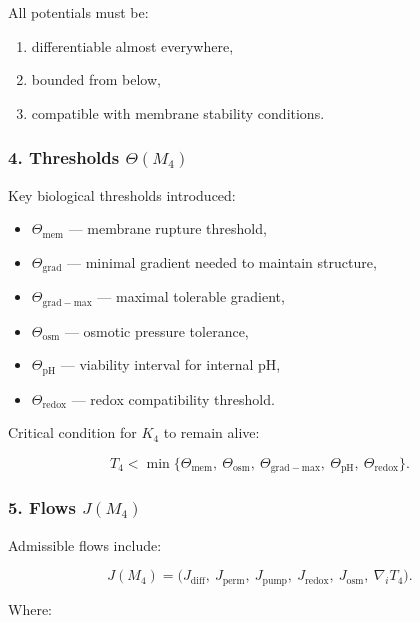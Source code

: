 All potentials must be:

\begin{enumerate}
    \item differentiable almost everywhere,
    \item bounded from below,
    \item compatible with membrane stability conditions.
\end{enumerate}

\subsubsection*{4. Thresholds \texorpdfstring{$\Theta(M_4)$}{\Theta(M_4)}}

Key biological thresholds introduced:

\begin{itemize}
    \item $\Theta_{\mathrm{mem}}$ — membrane rupture threshold,
    \item $\Theta_{\mathrm{grad}}$ — minimal gradient needed to maintain structure,
    \item $\Theta_{\mathrm{grad-max}}$ — maximal tolerable gradient,
    \item $\Theta_{\mathrm{osm}}$ — osmotic pressure tolerance,
    \item $\Theta_{\mathrm{pH}}$ — viability interval for internal pH,
    \item $\Theta_{\mathrm{redox}}$ — redox compatibility threshold.
\end{itemize}

Critical condition for $K_4$ to remain alive:

\[
T_4 < 
\min\{
\Theta_{\mathrm{mem}},\ 
\Theta_{\mathrm{osm}},\
\Theta_{\mathrm{grad-max}},\
\Theta_{\mathrm{pH}},\
\Theta_{\mathrm{redox}}
\}.
\]

\subsubsection*{5. Flows \texorpdfstring{$J(M_4)$}{J(M_4)}}

Admissible flows include:

\[
J(M_4)
=
\big(
J_{\mathrm{diff}},\
J_{\mathrm{perm}},\
J_{\mathrm{pump}},\
J_{\mathrm{redox}},\
J_{\mathrm{osm}},\
\nabla_i T_4
\big).
\]

Where:

